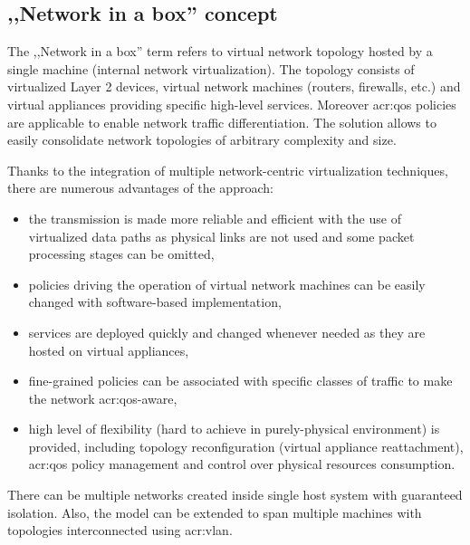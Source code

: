 \documentclass[11pt,openany]{book}
\begin{document}
      \subsection{,,Network in a box'' concept}

        The ,,Network in a box'' term refers to virtual network topology hosted by a single machine (internal network
        virtualization). The topology consists of virtualized Layer 2 devices, virtual network machines (routers,
        firewalls, etc.) and virtual appliances providing specific high-level services. Moreover \gls{acr:qos} policies
        are applicable to enable network traffic differentiation. The solution allows to easily consolidate network
        topologies of arbitrary complexity and size.

        Thanks to the integration of multiple network-centric virtualization techniques, there are numerous advantages
        of the approach:

        \begin{itemize}

          \item the transmission is made more reliable and efficient with the use of virtualized data paths as physical
                links are not used and some packet processing stages can be omitted,

          \item policies driving the operation of virtual network machines can be easily changed with software-based
                implementation,

          \item services are deployed quickly and changed whenever needed as they are hosted on virtual appliances,

          \item fine-grained policies can be associated with specific classes of traffic to make the network
                \gls{acr:qos}-aware,

          \item high level of flexibility (hard to achieve in purely-physical environment) is provided, including
                topology reconfiguration (virtual appliance reattachment), \gls{acr:qos} policy management and control
                over physical resources consumption.
        
        \end{itemize}

        There can be multiple networks created inside single host system with guaranteed isolation. Also, the model can
        be extended to span multiple machines with topologies interconnected using \gls{acr:vlan}.
\end{document}
